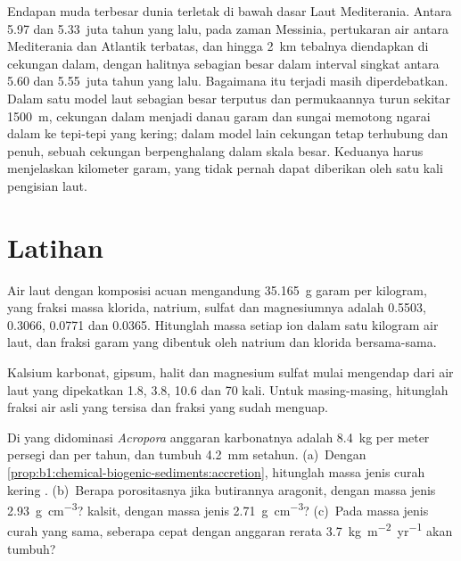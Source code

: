 Endapan  muda terbesar dunia terletak di bawah dasar Laut Mediterania. Antara 5.97 dan 5.33~juta tahun yang lalu, pada zaman Messinia, pertukaran air antara Mediterania dan Atlantik terbatas, dan  hingga \qty{2}{km} tebalnya diendapkan di cekungan dalam, dengan halitnya sebagian besar dalam interval singkat antara 5.60 dan 5.55~juta tahun yang lalu. Bagaimana itu terjadi masih diperdebatkan. Dalam satu model laut sebagian besar terputus dan permukaannya turun sekitar \qty{1500}{m}, cekungan dalam menjadi danau garam dan sungai memotong ngarai dalam ke tepi-tepi yang kering; dalam model lain cekungan tetap terhubung dan penuh, sebuah cekungan berpenghalang dalam skala besar. Keduanya harus menjelaskan kilometer garam, yang tidak pernah dapat diberikan oleh satu kali pengisian laut.

\section{Latihan}

\begin{exercise}[$\star$]\label{exo:b1:chemical-biogenic-sediments:1}
Air laut dengan komposisi acuan mengandung \qty{35.165}{g} garam per kilogram, yang fraksi massa klorida, natrium, sulfat dan magnesiumnya adalah 0.5503, 0.3066, 0.0771 dan 0.0365. Hitunglah massa setiap ion dalam satu kilogram air laut, dan fraksi garam yang dibentuk oleh natrium dan klorida bersama-sama.
\end{exercise}

\begin{exercise}[$\star$]\label{exo:b1:chemical-biogenic-sediments:2}
Kalsium karbonat, gipsum, halit dan magnesium sulfat mulai mengendap dari air laut yang dipekatkan 1.8, 3.8, 10.6 dan 70 kali. Untuk masing-masing, hitunglah fraksi air asli yang tersisa dan fraksi yang sudah menguap.
\end{exercise}

\begin{exercise}[$\star$]\label{exo:b1:chemical-biogenic-sediments:3}
Di  yang didominasi \emph{Acropora} anggaran karbonatnya adalah \qty{8.4}{kg}  per meter persegi dan per tahun, dan  tumbuh \qty{4.2}{mm} setahun. (a)~Dengan \cref{prop:b1:chemical-biogenic-sediments:accretion}, hitunglah massa jenis curah kering . (b)~Berapa porositasnya jika butirannya aragonit, dengan massa jenis \qty{2.93}{g.cm^{-3}}? kalsit, dengan massa jenis
\qty{2.71}{g.cm^{-3}}? (c)~Pada massa jenis curah yang sama, seberapa cepat  dengan anggaran rerata \qty{3.7}{kg.m^{-2}.yr^{-1}} akan tumbuh?
\end{exercise}

